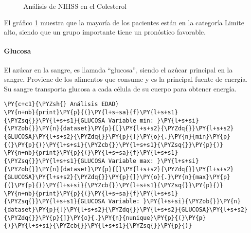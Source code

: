 \begin{center}
    	\begin{figure}[H]
	\centering
	\caption{Análisis de NIHSS en el Colesterol}
	\label{fig:aNISSc}
	\end{figure}
\end{center}
    
    El gráfico \ref{fig:aNISSc} muestra que la mayoría de los pacientes están en la categoría
Limite alto, siendo que un grupo importante tiene un pronóstico
favorable.

    \hypertarget{glucosa}{%
\paragraph{Glucosa}\label{glucosa}}

El azúcar en la sangre, es llamada ``glucosa'', siendo el azúcar
principal en la sangre. Proviene de los alimentos que consume y es la
principal fuente de energía. Su sangre transporta glucosa a cada célula
de su cuerpo para obtener energía.

    \begin{tcolorbox}[breakable, size=fbox, boxrule=1pt, pad at break*=1mm,colback=cellbackground, colframe=cellborder]
\begin{Verbatim}[commandchars=\\\{\}]
\PY{c+c1}{\PYZsh{} Análisis EDAD}
\PY{n+nb}{print}\PY{p}{(}\PY{l+s+sa}{f}\PY{l+s+s1}{\PYZsq{}}\PY{l+s+s1}{GLUCOSA Variable min: }\PY{l+s+si}{\PYZob{}}\PY{n}{dataset}\PY{p}{[}\PY{l+s+s2}{\PYZdq{}}\PY{l+s+s2}{GLUCOSA}\PY{l+s+s2}{\PYZdq{}}\PY{p}{]}\PY{o}{.}\PY{n}{min}\PY{p}{(}\PY{p}{)}\PY{l+s+si}{\PYZcb{}}\PY{l+s+s1}{\PYZsq{}}\PY{p}{)}
\PY{n+nb}{print}\PY{p}{(}\PY{l+s+sa}{f}\PY{l+s+s1}{\PYZsq{}}\PY{l+s+s1}{GLUCOSA Variable max: }\PY{l+s+si}{\PYZob{}}\PY{n}{dataset}\PY{p}{[}\PY{l+s+s2}{\PYZdq{}}\PY{l+s+s2}{GLUCOSA}\PY{l+s+s2}{\PYZdq{}}\PY{p}{]}\PY{o}{.}\PY{n}{max}\PY{p}{(}\PY{p}{)}\PY{l+s+si}{\PYZcb{}}\PY{l+s+s1}{\PYZsq{}}\PY{p}{)}
\PY{n+nb}{print}\PY{p}{(}\PY{l+s+sa}{f}\PY{l+s+s1}{\PYZsq{}}\PY{l+s+s1}{GLUCOSA Variable: }\PY{l+s+si}{\PYZob{}}\PY{n}{dataset}\PY{p}{[}\PY{l+s+s2}{\PYZdq{}}\PY{l+s+s2}{GLUCOSA}\PY{l+s+s2}{\PYZdq{}}\PY{p}{]}\PY{o}{.}\PY{n}{nunique}\PY{p}{(}\PY{p}{)}\PY{l+s+si}{\PYZcb{}}\PY{l+s+s1}{\PYZsq{}}\PY{p}{)}
\end{Verbatim}
\end{tcolorbox}

